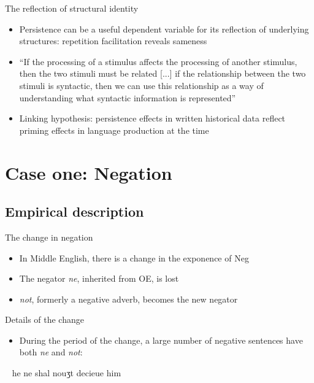 \documentclass{digs-slides}
\newcommand{\includegraph}[1]{\mode<beamer>{}
    \mode<handout>{}}
\begin{document}
\begin{frame}{The reflection of structural identity}
	\begin{itemize}
		\item Persistence can be a useful dependent variable for its reflection of underlying structures: repetition facilitation reveals sameness
		\item “If the processing of a stimulus affects the processing of another stimulus, then the two stimuli must be related [...] if the relationship between the two stimuli is syntactic, then we can use this relationship as a way of understanding what syntactic information is represented” \parencite[490]{Branigan:1995}
		\item Linking hypothesis: persistence effects in written historical data reflect priming effects in language production at the time
	\end{itemize}
\end{frame}




\section{Case one: Negation}

\subsection{Empirical description}
\label{sec:empirical-aspects}

\begin{frame}{The change in negation}
    \begin{itemize}
      \item In Middle English, there is a change in the exponence of Neg
      \item The negator \emph{ne}, inherited from OE, is lost
      \item \emph{not}, formerly a negative adverb, becomes the new negator
    \end{itemize}
\end{frame}

\begin{frame}{Details of the change}
    \begin{itemize}
      \item During the period of the change, a large number of negative
        sentences have both \emph{ne} and \emph{not}:
    \end{itemize}
    \ex~
    he ne shal nouʒt decieue him 
    \xe
    \begin{center}
        \includegraph{figures/three-lines}
    \end{center}
\end{frame}
\end{document}
